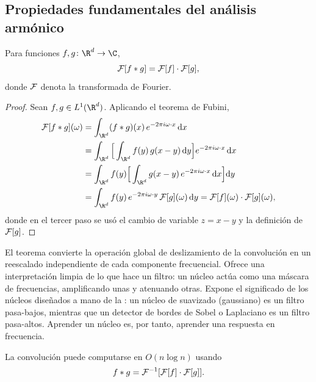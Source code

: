 \subsection{Propiedades fundamentales del an\'alisis arm\'onico}
\label{sec:grids:harmonic-properties}

\begin{theorem}
\label{thm:grids:conv-theorem}
Para funciones $f, g \colon \R^d \to \C$,
\[
  \mathcal{F}[f * g] = \mathcal{F}[f] \cdot \mathcal{F}[g],
\]
donde $\mathcal{F}$ denota la transformada de Fourier.
\end{theorem}

\begin{proof}
Sean $f, g \in L^1(\R^d)$. Aplicando el teorema de Fubini,
\begin{align}
\Ft[f \conv g](\omega)
  &= \int_{\R^d} (f \conv g)(x)\, e^{-2\pi i\omega \cdot x}\, \mathrm{d}x \nonumber \\
  &= \int_{\R^d} \Big[\int_{\R^d} f(y)\,g(x-y)\, \mathrm{d}y\Big]
       e^{-2\pi i\omega \cdot x}\, \mathrm{d}x \nonumber \\
  &= \int_{\R^d} f(y) \Big[\int_{\R^d} g(x-y)\, e^{-2\pi i\omega \cdot x}\, \mathrm{d}x\Big] \mathrm{d}y \nonumber \\
  &= \int_{\R^d} f(y)\, e^{-2\pi i\omega \cdot y}\, \Ft[g](\omega)\, \mathrm{d}y
   = \Ft[f](\omega) \cdot \Ft[g](\omega),
\end{align}
donde en el tercer paso se us\'o el cambio de variable $z = x - y$ y la
definici\'on de $\mathcal{F}[g]$.
\end{proof}

El teorema convierte la operaci\'on global de deslizamiento de la convoluci\'on
en un reescalado independiente de cada componente frecuencial. Ofrece una
interpretaci\'on limpia de lo que hace un filtro: un n\'ucleo act\'ua como una
m\'ascara de frecuencias, amplificando unas y atenuando otras. Expone el
significado de los n\'ucleos dise\~nados a mano de la : un
n\'ucleo de suavizado (gaussiano) es un filtro pasa-bajos, mientras que un
detector de bordes de Sobel o Laplaciano es un filtro pasa-altos. Aprender un
n\'ucleo es, por tanto, aprender una respuesta en frecuencia.

\begin{corollary}
\label{cor:grids:fft}
La convoluci\'on puede computarse en $O(n \log n)$ usando
\[
  f * g = \mathcal{F}^{-1}[\mathcal{F}[f] \cdot \mathcal{F}[g]].
\]
\end{corollary}

